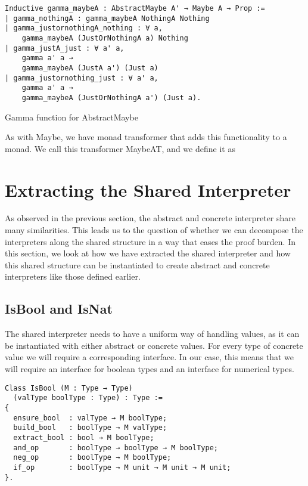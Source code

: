 \begin{listing}
\begin{verbatim}
Inductive gamma_maybeA : AbstractMaybe A' → Maybe A → Prop :=
| gamma_nothingA : gamma_maybeA NothingA Nothing
| gamma_justornothingA_nothing : ∀ a, 
    gamma_maybeA (JustOrNothingA a) Nothing
| gamma_justA_just : ∀ a' a, 
    gamma a' a → 
    gamma_maybeA (JustA a') (Just a)
| gamma_justornothing_just : ∀ a' a, 
    gamma a' a →
    gamma_maybeA (JustOrNothingA a') (Just a).
\end{verbatim}
\caption{Gamma function for AbstractMaybe}
\label{lst:gamma_maybeA}
\end{listing}

As with Maybe, we have monad transformer that adds this functionality to a
monad. We call this transformer MaybeAT, and we define it as \\

\section{Extracting the Shared Interpreter}\label{sec:shared_interpreter}
As observed in the previous section, the abstract and concrete interpreter
share many similarities. This leads us to the question of whether we can
decompose the interpreters along the shared structure in a way that eases the
proof burden. In this section, we look at how we have extracted the shared
interpreter and how this shared structure can be instantiated to create
abstract and concrete interpreters like those defined earlier.

\subsection{IsBool and IsNat}
The shared interpreter needs to have a uniform way of handling values, as it
can be instantiated with either abstract or concrete values. For every type of
concrete value we will require a corresponding interface. In our case, this
means that we will require an interface for boolean types and an interface for
numerical types.

\begin{verbatim}
Class IsBool (M : Type → Type)
  (valType boolType : Type) : Type :=
{
  ensure_bool  : valType → M boolType;
  build_bool   : boolType → M valType;
  extract_bool : bool → M boolType;
  and_op       : boolType → boolType → M boolType;
  neg_op       : boolType → M boolType;
  if_op        : boolType → M unit → M unit → M unit;
}.
\end{verbatim}

